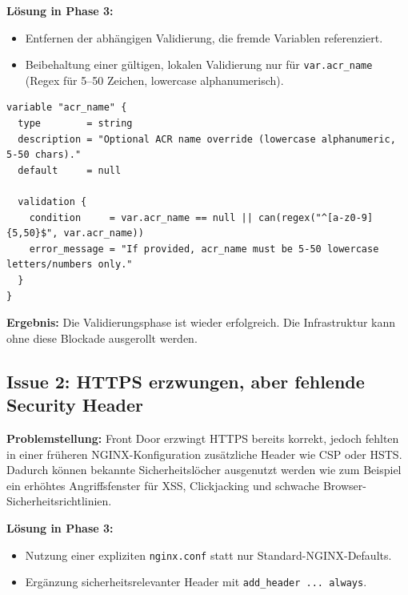 \documentclass[a4paper,11pt]{article}
\begin{document}
\textbf{Lösung in Phase 3:}
\begin{itemize}
  \item Entfernen der abhängigen Validierung, die fremde Variablen referenziert.
  \item Beibehaltung einer gültigen, lokalen Validierung nur für \texttt{var.acr\_name} (Regex für 5--50 Zeichen, lowercase alphanumerisch).
\end{itemize}

\begin{lstlisting}[caption={Gültiges Validierungsmuster für acr\_name in der aktuellen Struktur}]
variable "acr_name" {
  type        = string
  description = "Optional ACR name override (lowercase alphanumeric, 5-50 chars)."
  default     = null

  validation {
    condition     = var.acr_name == null || can(regex("^[a-z0-9]{5,50}$", var.acr_name))
    error_message = "If provided, acr_name must be 5-50 lowercase letters/numbers only."
  }
}
\end{lstlisting}

\textbf{Ergebnis:} Die Validierungsphase ist wieder erfolgreich. Die Infrastruktur kann ohne diese Blockade ausgerollt werden.

\subsection{Issue 2: HTTPS erzwungen, aber fehlende Security Header}
\textbf{Problemstellung:} Front Door erzwingt HTTPS bereits korrekt, jedoch fehlten in einer früheren NGINX-Konfiguration zusätzliche Header wie CSP oder HSTS.
Dadurch können bekannte Sicherheitslöcher ausgenutzt werden wie zum Beispiel ein erhöhtes Angriffsfenster für XSS, Clickjacking und schwache Browser-Sicherheitsrichtlinien.

\textbf{Lösung in Phase 3:}
\begin{itemize}
  \item Nutzung einer expliziten \texttt{nginx.conf} statt nur Standard-NGINX-Defaults.
  \item Ergänzung sicherheitsrelevanter Header mit \texttt{add\_header ... always}.
\end{itemize}
\end{document}
